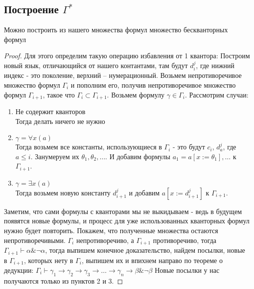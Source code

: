 \subsection{Построение $\Gamma ^ *$}
\label{sec-8-5}
\begin{theorem}
Можно построить из нашего множества формул множество бескванторных формул
\end{theorem}
\begin{proof}
Для этого определим такую операцию избавления от 1 квантора: Построим новый язык, отличающийся от нашего контантами, там будут $d_i^j$, где нижний индекс - это поколение, верхний – нумерационный. Возьмем непротиворечивое множество формул $\Gamma_i$ и пополним его, получив непротиворечивое множество формул $\Gamma_{i+1}$, такое что $\Gamma_i \subset \Gamma_{i+1}$. Возьмем формулу $\gamma \in \Gamma_{i}$. Рассмотрим случаи:
\begin{enumerate}
\item Не содержит кванторов\\
Тогда делать ничего не нужно
\item $\gamma = \forall x (a)$\\
Тогда возьмем все константы, использующиеся в $\Gamma_{i}$ - это будут $c_i$, $d_a^j$, где $a \leq i$. Занумеруем их $\theta_1, \theta_2, \dots$. И добавим формулы $a_1=a[x:=\theta_1], \dots$ к $\Gamma_{i+1}$.
\item $\gamma = \exists x (a)$\\
Тогда возьмем новую константу $d_{i+1}^j$ и добавим $a[x:=d_{i+1}^j]$ к $\Gamma_{i+1}$.
\end{enumerate}

Заметим, что сами формулы с кванторами мы не выкидываем - ведь в будущем появятся новые формулы, и процесс для уже использованных кванторных формул нужно будет повторить. Покажем, что полученные множества остаются непротиворечивыми. $\Gamma_i$ непротиворечиво, а $\Gamma_{i+1}$ противоречиво, тогда $\Gamma_{i+1} \vdash \alpha \& \neg \alpha$, тогда выпишем конечное доказательство, найдем посылки, новые в $\Gamma_{i+1}$, которых нету в $\Gamma_{i}$, выпишем их и впихнем направо по теореме о дедукции: $\Gamma_{i} \vdash \gamma_1 \to \gamma_2 \to \gamma_3 \to \dots \to \gamma_n \to \beta \& \neg \beta$ Новые посылки у нас получаются только из пунктов 2 и 3.


\end{proof}
